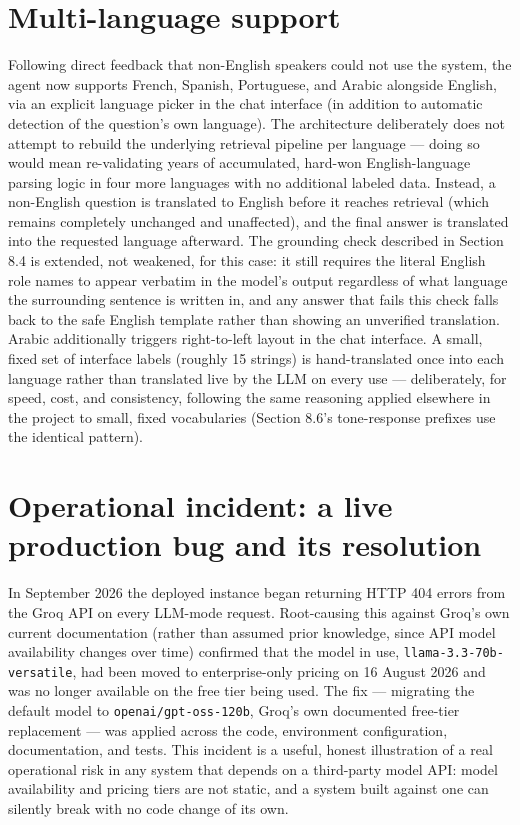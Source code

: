 \section{Multi-language support}
Following direct feedback that non-English speakers could not use the system, the agent now supports French, Spanish, Portuguese, and Arabic alongside English, via an explicit language picker in the chat interface (in addition to automatic detection of the question's own language). The architecture deliberately does not attempt to rebuild the underlying retrieval pipeline per language — doing so would mean re-validating years of accumulated, hard-won English-language parsing logic in four more languages with no additional labeled data. Instead, a non-English question is translated to English before it reaches retrieval (which remains completely unchanged and unaffected), and the final answer is translated into the requested language afterward. The grounding check described in Section 8.4 is extended, not weakened, for this case: it still requires the literal English role names to appear verbatim in the model's output regardless of what language the surrounding sentence is written in, and any answer that fails this check falls back to the safe English template rather than showing an unverified translation. Arabic additionally triggers right-to-left layout in the chat interface. A small, fixed set of interface labels (roughly 15 strings) is hand-translated once into each language rather than translated live by the LLM on every use — deliberately, for speed, cost, and consistency, following the same reasoning applied elsewhere in the project to small, fixed vocabularies (Section 8.6's tone-response prefixes use the identical pattern).

\section{Operational incident: a live production bug and its resolution}
In September 2026 the deployed instance began returning HTTP 404 errors from the Groq API on every LLM-mode request. Root-causing this against Groq's own current documentation (rather than assumed prior knowledge, since API model availability changes over time) confirmed that the model in use, \texttt{llama-3.3-70b-versatile}, had been moved to enterprise-only pricing on 16 August 2026 and was no longer available on the free tier being used. The fix — migrating the default model to \texttt{openai/\allowbreak{}gpt-oss-120b}, Groq's own documented free-tier replacement — was applied across the code, environment configuration, documentation, and tests. This incident is a useful, honest illustration of a real operational risk in any system that depends on a third-party model API: model availability and pricing tiers are not static, and a system built against one can silently break with no code change of its own.

